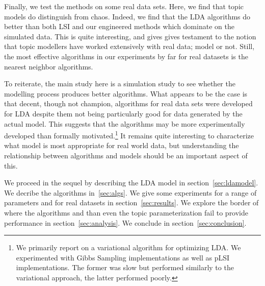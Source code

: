Finally, we test the methods on some real data sets.  Here, we find
that topic models do distinguish from chaos. Indeed, we find that the
LDA algorithms do better than both LSI and our engineered methods
which dominate on the simulated data.  This is quite interesting, and
gives gives testament to the notion that topic modellers have worked
extensively with real data; model or not.  Still, the most effective
algorithms in our experiments by far for real datasets is the nearest
neighbor algorithms.

To reiterate, the main study here is a simulation study to see whether
the modelling process produces better algorithms.  What appears to be
the case is that decent, though not champion, algorithms for real data
sets were developed for LDA despite them not being particularly good
for data generated by the actual model.  This suggests that the
algorithms may be more experimentally developed than formally
motivated.\footnote{We primarily report on a variational algorithm
for optimizing LDA.  We experimented with Gibbs Sampling
implementations as well as pLSI implementations.  The former was slow
but performed similarly to the variational approach, the latter
performed poorly.}  It remains quite interesting to characterize
what model is most appropriate for real world data, but 
understanding the relationship between algorithms and models
should be an important aspect of this. 

We proceed in the sequel by describing the LDA model in
section~\ref{sec:ldamodel}. We decribe the algorithms
in~\ref{sec:algs}. We give some experiments for a range of parameters
and for real datasets in section~\ref{sec:results}.  We explore the
border of where the algorithms and than even the topic
parameterization fail to provide performance in
section~\ref{sec:analysis}.  We conclude in
section~\ref{sec:conclusion}.





